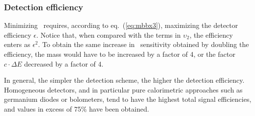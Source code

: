 
\subsubsection{Detection efficiency} 

Minimizing \mbb\ requires, according to eq.~(\ref{eq:mbbx3}), maximizing the detector efficiency $\epsilon$. Notice that, when compared with the terms in $\upsilon_2$, 
the efficiency enters as $\epsilon^2$. 
To obtain the same increase in \mbb\ sensitivity obtained by doubling the efficiency, the mass would have to be increased by a factor of 4, or the factor
$c\cdot \Delta E$ decreased by a factor of 4. 

In general, the simpler the detection scheme, the higher the detection efficiency. Homogeneous detectors, 
and in particular 
pure calorimetric approaches such as germanium diodes or bolometers, tend to have the highest total signal efficiencies, and values in excess of 75\% have been obtained. 
%

